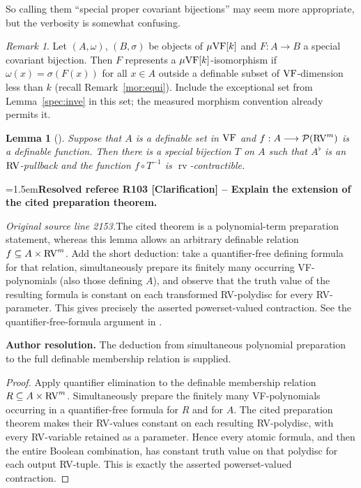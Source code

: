\documentclass[12pt]{amsart}
\newcommand{\ResolvedRefereeRemark}[5]{%
  \par\medskip\begingroup\normalfont\small\color{gray}%
  \emergencystretch=1.5em\noindent\textbf{Resolved referee R#1 [#2] -- #3.}\par\nobreak\noindent #4\par
  \medskip\color{ResolutionGreen}\noindent\textbf{Author resolution.} #5\par
  \endgroup\medskip
}
\theoremstyle{plain}
\newtheorem{lem}[thm]{Lemma}
\theoremstyle{definition}
\theoremstyle{remark}
\newtheorem{rem}[thm]{Remark}
\numberwithin{equation}{section}
\theoremstyle{plain}
\newcommand{\VF}{\textup{VF}}
\newcommand{\RV}{\textup{RV}}
\newcommand{\0}{\emptyset}
\newcommand{\mdl}[1]{\mathcal{#1}}  %
\newcommand{\fun}{\longrightarrow}
\newcommand{\sub}{\subseteq}
\newcommand{\mgVF}{{\mu} {\VF}}
\DeclareMathOperator{\rv}{rv}
\begin{document}
So calling them ``special proper covariant bijections'' may seem more appropriate, but the verbosity is somewhat confusing.


\begin{rem}\label{spec:is:iso}
Let $(A,\omega)$, $(B, \sigma)$ be objects of $\mgVF[k]$ and $F : A \fun B$ a special covariant bijection. Then  $F$ represents a $\mgVF[k]$-isomorphism if $\omega(x) = \sigma(F(x))$ for all $x \in A$ outside a definable subset of $\VF$-dimension less than $k$ (recall Remark~\ref{mor:equi}). Include the exceptional set from Lemma~\ref{spec:inve} in this set; the measured morphism convention already permits it.
\end{rem}



\begin{lem}[{\cite[Theorem~5.5]{Yin:special:trans}}]\label{special:bi:term:constant}
Suppose that $A$ is a definable set in $\VF$ and $f : A \fun \mdl P(\RV^m)$ is a definable function. Then there is a special bijection $T$ on $A$ such that $A^\flat$ is an $\RV$-pullback and the function $f \circ T^{-1}$ is $\rv$-contractible.
\end{lem}

\ResolvedRefereeRemark{103}{Clarification}{Explain the extension of the cited preparation theorem}{%
\textit{Original source line 2153.}\quad The cited theorem is a polynomial-term preparation statement, whereas this lemma allows an arbitrary definable relation $f\subseteq A\times\RV^m$. Add the short deduction: take a quantifier-free defining formula for that relation, simultaneously prepare its finitely many occurring VF-polynomials (also those defining $A$), and observe that the truth value of the resulting formula is constant on each transformed RV-polydisc for every RV-parameter. This gives precisely the asserted powerset-valued contraction. See the quantifier-free-formula argument in \cite[Theorem~5.5 and Corollary~5.6]{Yin:special:trans}.
}{The deduction from simultaneous polynomial preparation to the full definable membership relation is supplied.}
\begin{proof}
Apply quantifier elimination to the definable membership relation $R\sub A\times\RV^m$. Simultaneously prepare the finitely many VF-polynomials occurring in a quantifier-free formula for $R$ and for $A$. The cited preparation theorem makes their RV-values constant on each resulting RV-polydisc, with every RV-variable retained as a parameter. Hence every atomic formula, and then the entire Boolean combination, has constant truth value on that polydisc for each output RV-tuple. This is exactly the asserted powerset-valued contraction.
\end{proof}
\end{document}
